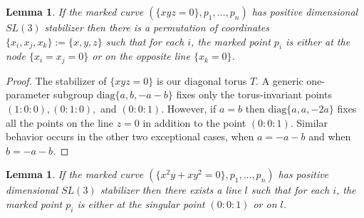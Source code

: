 \documentclass{amsart}
\newcommand{\diag}{\text{diag}}
\numberwithin{equation}{section}
\newtheorem{lemma}[prop]{Lemma}
\theoremstyle{definition}
\begin{document}
\begin{lemma}\label{lemma:TriangleStbz}
    If the marked curve $(\{xyz =0\}, p_1, \dots , p_n)$ has positive dimensional $SL(3)$ stabilizer then there is a permutation of coordinates $\{x_i, x_j, x_k\} := \{x,y,z\}$ such that for each $i$, the marked point $p_i$ is either at the node $\{x_i=x_j=0\}$ or on the opposite line $\{x_k=0\}$. 
\end{lemma}

\begin{proof}
    The stabilizer of $\{xyz=0\}$ is our diagonal torus $T$. A generic one-parameter subgroup $\diag\{a,b,-a-b\}$ fixes only the torus-invariant points $(1:0:0), (0:1:0),$ and $(0:0:1)$. However, if $a=b$ then $\diag\{a,a,-2a\}$ fixes all the points on the line $z=0$ in addition to the point $(0:0:1)$. Similar behavior occurs in the other two exceptional cases, when $a=-a-b$ and when $b=-a-b$.
\end{proof}



\begin{lemma}\label{lemma:D4Stbz}
    If the marked curve $(\{x^2y +xy^2 =0\}, p_1, \dots , p_n)$ has positive dimensional $SL(3)$ stabilizer then there exists a line $l$ such that for each $i$, the marked point $p_i$ is either at the singular point $(0:0:1)$ or on $l$.
\end{lemma}
\end{document}
